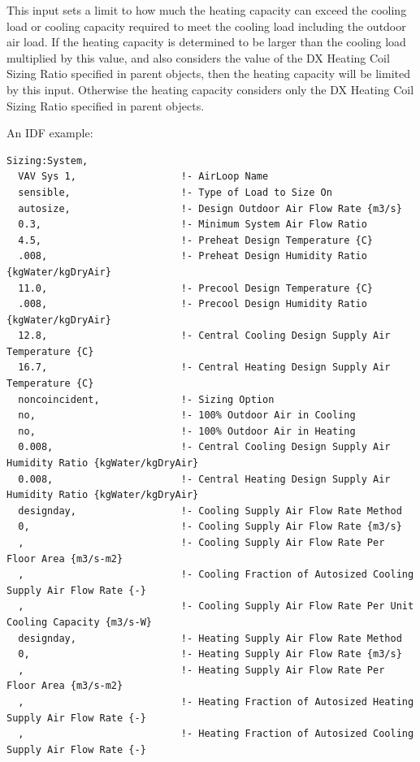 This input sets a limit to how much the heating capacity can exceed the cooling load or cooling capacity required to meet the cooling load including the outdoor air load. If the heating capacity is determined to be larger than the cooling load multiplied by this value, and also considers the value of the DX Heating Coil Sizing Ratio specified in parent objects, then the heating capacity will be limited by this input. Otherwise the heating capacity considers only the DX Heating Coil Sizing Ratio specified in parent objects.

An IDF example:

\begin{lstlisting}
Sizing:System,
  VAV Sys 1,                  !- AirLoop Name
  sensible,                   !- Type of Load to Size On
  autosize,                   !- Design Outdoor Air Flow Rate {m3/s}
  0.3,                        !- Minimum System Air Flow Ratio
  4.5,                        !- Preheat Design Temperature {C}
  .008,                       !- Preheat Design Humidity Ratio {kgWater/kgDryAir}
  11.0,                       !- Precool Design Temperature {C}
  .008,                       !- Precool Design Humidity Ratio {kgWater/kgDryAir}
  12.8,                       !- Central Cooling Design Supply Air Temperature {C}
  16.7,                       !- Central Heating Design Supply Air Temperature {C}
  noncoincident,              !- Sizing Option
  no,                         !- 100% Outdoor Air in Cooling
  no,                         !- 100% Outdoor Air in Heating
  0.008,                      !- Central Cooling Design Supply Air Humidity Ratio {kgWater/kgDryAir}
  0.008,                      !- Central Heating Design Supply Air Humidity Ratio {kgWater/kgDryAir}
  designday,                  !- Cooling Supply Air Flow Rate Method
  0,                          !- Cooling Supply Air Flow Rate {m3/s}
  ,                           !- Cooling Supply Air Flow Rate Per Floor Area {m3/s-m2}
  ,                           !- Cooling Fraction of Autosized Cooling Supply Air Flow Rate {-}
  ,                           !- Cooling Supply Air Flow Rate Per Unit Cooling Capacity {m3/s-W}
  designday,                  !- Heating Supply Air Flow Rate Method
  0,                          !- Heating Supply Air Flow Rate {m3/s}
  ,                           !- Heating Supply Air Flow Rate Per Floor Area {m3/s-m2}
  ,                           !- Heating Fraction of Autosized Heating Supply Air Flow Rate {-}
  ,                           !- Heating Fraction of Autosized Cooling Supply Air Flow Rate {-}

\end{lstlisting}
